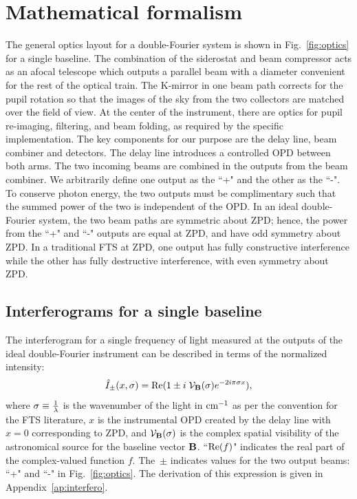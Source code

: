 \section{Mathematical formalism}
\label{sec:formalism}
The general optics layout for a double-Fourier system is shown in Fig.~\ref{fig:optics} for a single baseline. 
The combination of the siderostat and beam compressor acts as an afocal telescope 
which outputs a  parallel beam with a diameter convenient for the rest of the optical train.
The K-mirror in one beam path corrects for the pupil rotation so that the
images of the sky from the two collectors are matched over the field of view.
At the center of the instrument, there are optics for pupil re-imaging, filtering, and beam folding, as required by the specific implementation.
The key components for our purpose are the delay line, beam combiner and detectors. 
The delay line introduces a controlled OPD between both arms.
The two incoming beams are combined in the outputs from the beam combiner. 
We arbitrarily define one output as the ``+" and the other as the \mbox{``-"}. 
To conserve photon energy, the two outputs must be complimentary such that the summed power of the two is
independent of the OPD. In an ideal double-Fourier system, the two beam paths are symmetric about ZPD; 
hence, the power 
from the ``+" and ``-" outputs are equal at ZPD, and have odd symmetry about ZPD. In a traditional FTS at ZPD, one output has fully constructive interference while the other has fully destructive interference, with even symmetry about ZPD.

\subsection{Interferograms for a single baseline}

The interferogram for a single frequency of light measured at the outputs of the ideal double-Fourier instrument can be 
described in terms of the normalized intensity:
\begin{equation}
\hat{I}_\pm(x,\sigma) = \textrm{Re}(1 \pm i \; \mathcal{V}_{\mathbf{B}}(\sigma) e^{-2i\pi \sigma x}),
\label{eq:basicinterferogram}
\end{equation}
where $\sigma \equiv {1 \over \lambda}$ is the wavenumber of the light in $\cm1$ as per the convention for the FTS literature, $x$ is the instrumental OPD created by the delay line with $x=0$ corresponding to ZPD, and $\mathcal{V}_{\mathbf{B}}(\sigma)$ is the complex spatial visibility
 of the astronomical source for the baseline vector $\mathbf{B}$. ``$\textrm{Re}(f)$" indicates the real part of the complex-valued function $f$. The~$\pm$ indicates values for the two output beams: ``+" and ``-" in Fig.~\ref{fig:optics}.
The derivation of this expression is given in Appendix~\ref{ap:interfero}.

